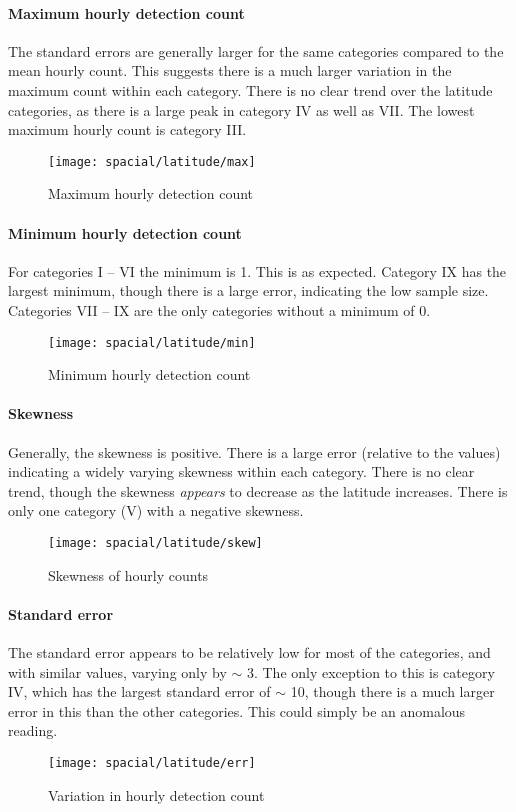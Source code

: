 \paragraph{Maximum hourly detection count\\}
The standard errors are generally larger for the same categories compared to the mean hourly count. This suggests there is a much larger variation in the maximum count within each category. There is no clear trend over the latitude categories, as there is a large peak in category IV as well as VII. The lowest maximum hourly count is category III.
\begin{figure}[h!]
	\centering
	\texttt{[image: spacial/latitude/max]}
	\caption{Maximum hourly detection count
		\label{fig:spac:lat:max}}
\end{figure}

\paragraph{Minimum hourly detection count\\}
For categories I -- VI the minimum is 1. This is as expected. Category IX has the largest minimum, though there is a large error, indicating the low sample size. Categories VII -- IX are the only categories without a minimum of 0. 
\begin{figure}[h!]
	\centering
	\texttt{[image: spacial/latitude/min]}
	\caption{Minimum hourly detection count
		\label{fig:spac:lat:min}}
\end{figure}
\paragraph{Skewness\\}
Generally, the skewness is positive. There is a large error (relative to the values) indicating a widely varying skewness within each category. There is no clear trend, though the skewness {\it appears} to decrease as the latitude increases. There is only one category (V) with a negative skewness.
\begin{figure}[h!]
	\centering
	\texttt{[image: spacial/latitude/skew]}
	\caption{Skewness of hourly counts
		\label{fig:spac:lat:skew}}
\end{figure}
\paragraph{Standard error\\}
The standard error appears to be relatively low for most of the categories, and with similar values, varying only by $\sim$ 3. The only exception to this is category IV, which has the largest standard error of $\sim$ 10, though there is a much larger error in this than the other categories. This could simply be an anomalous reading.
\begin{figure}[h!]
	\centering
	\texttt{[image: spacial/latitude/err]}
	\caption{Variation in hourly detection count 
		\label{fig:spac:lat:err}}
\end{figure}
